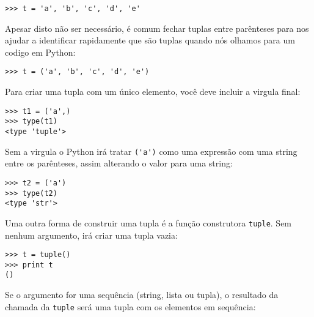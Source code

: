 \beforeverb
\begin{verbatim}
>>> t = 'a', 'b', 'c', 'd', 'e'
\end{verbatim}
\afterverb
%
Apesar disto não ser necessário, é comum fechar tuplas entre parênteses para
nos ajudar a identificar rapidamente que são tuplas quando nós olhamos para
um codigo em Python:


\beforeverb
\begin{verbatim}
>>> t = ('a', 'b', 'c', 'd', 'e')
\end{verbatim}
\afterverb
%
Para criar uma tupla com um único elemento, você deve incluir a virgula final:


\beforeverb
\begin{verbatim}
>>> t1 = ('a',)
>>> type(t1)
<type 'tuple'>
\end{verbatim}
\afterverb
%
Sem a virgula o Python irá tratar \verb"('a')" como uma expressão com uma
string entre os parênteses, assim alterando o valor para uma string:

\beforeverb
\begin{verbatim}
>>> t2 = ('a')
>>> type(t2)
<type 'str'>
\end{verbatim}
\afterverb
%
Uma outra forma de construir uma tupla é a função construtora {\tt tuple}.
Sem nenhum argumento, irá criar uma tupla vazia:


\beforeverb
\begin{verbatim}
>>> t = tuple()
>>> print t
()
\end{verbatim}
\afterverb
%
Se o argumento for uma sequência (string, lista ou tupla), o resultado da
chamada da {\tt tuple} será uma tupla com os elementos em sequência:

